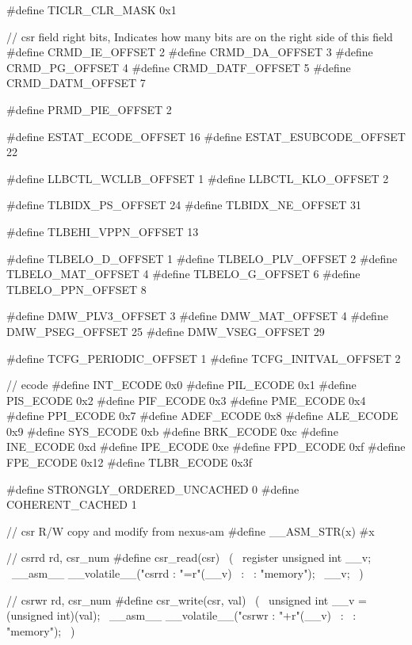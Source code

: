 \begin{CodeBlock}[language=BookC]
#define TICLR_CLR_MASK      0x1

// csr field right bits, Indicates how many bits are on the right side of this field
#define CRMD_IE_OFFSET       2
#define CRMD_DA_OFFSET       3
#define CRMD_PG_OFFSET       4
#define CRMD_DATF_OFFSET     5
#define CRMD_DATM_OFFSET     7

#define PRMD_PIE_OFFSET      2

#define ESTAT_ECODE_OFFSET   16
#define ESTAT_ESUBCODE_OFFSET    22

#define LLBCTL_WCLLB_OFFSET  1
#define LLBCTL_KLO_OFFSET    2

#define TLBIDX_PS_OFFSET     24
#define TLBIDX_NE_OFFSET     31

#define TLBEHI_VPPN_OFFSET   13

#define TLBELO_D_OFFSET      1
#define TLBELO_PLV_OFFSET    2
#define TLBELO_MAT_OFFSET    4
#define TLBELO_G_OFFSET      6
#define TLBELO_PPN_OFFSET    8

#define DMW_PLV3_OFFSET      3
#define DMW_MAT_OFFSET       4
#define DMW_PSEG_OFFSET      25
#define DMW_VSEG_OFFSET      29

#define TCFG_PERIODIC_OFFSET 1
#define TCFG_INITVAL_OFFSET  2

// ecode
#define INT_ECODE   0x0
#define PIL_ECODE   0x1
#define PIS_ECODE   0x2
#define PIF_ECODE   0x3
#define PME_ECODE   0x4
#define PPI_ECODE   0x7
#define ADEF_ECODE  0x8
#define ALE_ECODE   0x9
#define SYS_ECODE   0xb
#define BRK_ECODE   0xc
#define INE_ECODE   0xd
#define IPE_ECODE   0xe
#define FPD_ECODE   0xf
#define FPE_ECODE   0x12
#define TLBR_ECODE  0x3f

#define STRONGLY_ORDERED_UNCACHED 0
#define COHERENT_CACHED           1

// csr R/W copy and modify from nexus-am
#define __ASM_STR(x)    #x

// csrrd rd, csr_num
#define csr_read(csr)       \
    ({                      \
        register unsigned int __v;  \
        __asm__ __volatile__("csrrd %
                            : "=r"(__v)    \
                            :                  \
                            : "memory");       \
        __v;    \
    })

// csrwr rd, csr_num
#define csr_write(csr, val)                                        \
    ({                                                         \
        unsigned int __v = (unsigned int)(val);          \
        __asm__ __volatile__("csrwr %
                     : "+r"(__v)                           \
                     :                    \
                     : "memory");                  \
    })


\end{CodeBlock}
